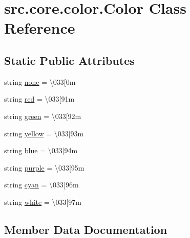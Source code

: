 \hypertarget{classsrc_1_1core_1_1color_1_1Color}{}\section{src.\+core.\+color.\+Color Class Reference}
\label{classsrc_1_1core_1_1color_1_1Color}
\subsection*{Static Public Attributes}
\begin{DoxyCompactItemize}
\item 
string \hyperlink{classsrc_1_1core_1_1color_1_1Color_ad9c1eb53da416b311597a25ec8b6fd52}{none} = \textquotesingle{}\textbackslash{}033\mbox{[}0m\textquotesingle{}
\item 
string \hyperlink{classsrc_1_1core_1_1color_1_1Color_a1031a20cc2bdf64cc3d28b2546cfcc4e}{red} = \textquotesingle{}\textbackslash{}033\mbox{[}91m\textquotesingle{}
\item 
string \hyperlink{classsrc_1_1core_1_1color_1_1Color_a90db613858d3ded1fa9fffa2970d6cac}{green} = \textquotesingle{}\textbackslash{}033\mbox{[}92m\textquotesingle{}
\item 
string \hyperlink{classsrc_1_1core_1_1color_1_1Color_ae679f19112a1c3c6c91b5e7b8bbe2571}{yellow} = \textquotesingle{}\textbackslash{}033\mbox{[}93m\textquotesingle{}
\item 
string \hyperlink{classsrc_1_1core_1_1color_1_1Color_ae551fbcf974c688355b334c6f4d7c411}{blue} = \textquotesingle{}\textbackslash{}033\mbox{[}94m\textquotesingle{}
\item 
string \hyperlink{classsrc_1_1core_1_1color_1_1Color_a7a5ac5a1852e67a22b6bdd2cf9640a74}{purple} = \textquotesingle{}\textbackslash{}033\mbox{[}95m\textquotesingle{}
\item 
string \hyperlink{classsrc_1_1core_1_1color_1_1Color_a4ff0ae2ff0959548a67750d4f2a10fad}{cyan} = \textquotesingle{}\textbackslash{}033\mbox{[}96m\textquotesingle{}
\item 
string \hyperlink{classsrc_1_1core_1_1color_1_1Color_a6b2f32d8cb5ac52330ea7633c4e8d7de}{white} = \textquotesingle{}\textbackslash{}033\mbox{[}97m\textquotesingle{}
\end{DoxyCompactItemize}


\subsection{Member Data Documentation}
\hypertarget{classsrc_1_1core_1_1color_1_1Color_ae551fbcf974c688355b334c6f4d7c411}{}
